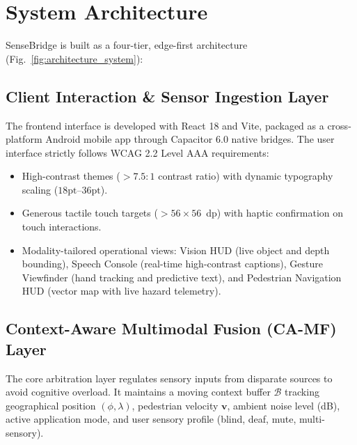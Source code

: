 \documentclass[conference]{IEEEtran}
\begin{document}
\section{System Architecture}

SenseBridge is built as a four-tier, edge-first architecture (Fig.~\ref{fig:architecture_system}):

\subsection{Client Interaction \& Sensor Ingestion Layer}
The frontend interface is developed with React 18 and Vite, packaged as a cross-platform Android mobile app through Capacitor 6.0 native bridges. The user interface strictly follows WCAG 2.2 Level AAA requirements:
\begin{itemize}
    \item High-contrast themes ($>7.5:1$ contrast ratio) with dynamic typography scaling ($18\text{pt}$--$36\text{pt}$).
    \item Generous tactile touch targets ($>56\times 56$~dp) with haptic confirmation on touch interactions.
    \item Modality-tailored operational views: Vision HUD (live object and depth bounding), Speech Console (real-time high-contrast captions), Gesture Viewfinder (hand tracking and predictive text), and Pedestrian Navigation HUD (vector map with live hazard telemetry).
\end{itemize}

\subsection{Context-Aware Multimodal Fusion (CA-MF) Layer}
The core arbitration layer regulates sensory inputs from disparate sources to avoid cognitive overload. It maintains a moving context buffer $\mathcal{B}$ tracking geographical position $(\phi, \lambda)$, pedestrian velocity $\mathbf{v}$, ambient noise level (dB), active application mode, and user sensory profile (blind, deaf, mute, multi-sensory).
\end{document}
